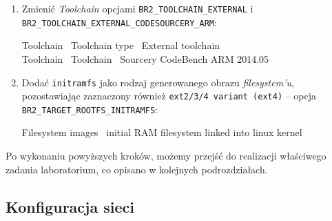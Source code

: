 \documentclass{article}
\newenvironment{ttblock}{\ttfamily}{\par}
\begin{document}
\begin{enumerate}
\item Zmienić \emph{Toolchain} opcjami \texttt{BR2\_TOOLCHAIN\_EXTERNAL} i\\ \texttt{BR2\_TOOLCHAIN\_EXTERNAL\_CODESOURCERY\_ARM}:

\begin{ttblock}
Toolchain \textrightarrow\ Toolchain type \textrightarrow\ External toolchain\\
Toolchain \textrightarrow\ Toolchain \textrightarrow\ Sourcery CodeBench ARM 2014.05
\end{ttblock}

\item Dodać \texttt{initramfs} jako rodzaj generowanego obrazu \emph{filesystem'u}, pozostawiając zaznaczony również \texttt{ext2/3/4 variant (ext4)} -- opcja \\\texttt{BR2\_TARGET\_ROOTFS\_INITRAMFS}:

\begin{ttblock}
Filesystem images \textrightarrow\ initial RAM filesystem linked into linux kernel
\end{ttblock}
\end{enumerate}

Po wykonaniu powyższych kroków, możemy przejść do realizacji właściwego zadania laboratorium, co opisano w kolejnych podrozdziałach.


\subsection{Konfiguracja sieci}
\end{document}
